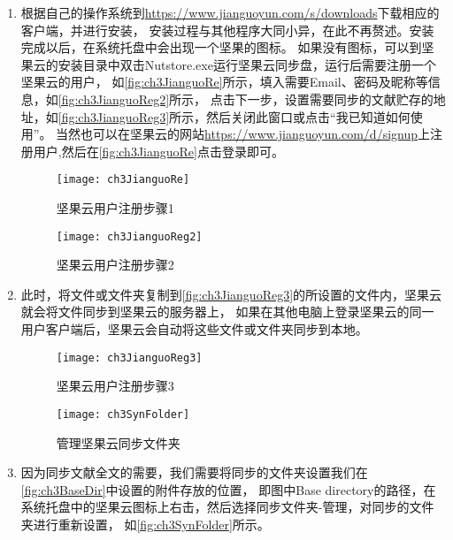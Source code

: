 \documentclass[cn,11pt,chinese]{elegantbook}
\begin{document}
		\begin{enumerate}
			\item 根据自己的操作系统到\url{https://www.jianguoyun.com/s/downloads}下载相应的客户端，并进行安装，
			安装过程与其他程序大同小异，在此不再赘述。安装完成以后，在系统托盘中会出现一个坚果的图标。
			如果没有图标，可以到坚果云的安装目录中双击Nutstore.exe运行坚果云同步盘，运行后需要注册一个坚果云的用户，
			如\autoref{fig:ch3JianguoRe}所示，填入需要Email、密码及昵称等信息，如\autoref{fig:ch3JianguoReg2}所示，
			点击下一步，设置需要同步的文献贮存的地址，如\autoref{fig:ch3JianguoReg3}所示，然后关闭此窗口或点击“我已知道如何使用”。
			当然也可以在坚果云的网站\url{https://www.jianguoyun.com/d/signup}上注册用户,然后在\autoref{fig:ch3JianguoRe}点击登录即可。
			
			\begin{figure}[htbp]
				\centering
				\begin{minipage}[t]{\dimexpr0.5\textwidth-4em}
					\centering
					\texttt{[image: ch3JianguoRe]}
					\caption{坚果云用户注册步骤1}
					\label{fig:ch3JianguoRe}
				\end{minipage}
				\centering
				\begin{minipage}[t]{\dimexpr0.5\textwidth-4em}
					\centering
					\texttt{[image: ch3JianguoReg2]}
					\caption{坚果云用户注册步骤2}
					\label{fig:ch3JianguoReg2}
				\end{minipage}	
			\end{figure}
			

			
			\item 此时，将文件或文件夹复制到\autoref{fig:ch3JianguoReg3}的所设置的文件内，坚果云就会将文件同步到坚果云的服务器上，
			如果在其他电脑上登录坚果云的同一用户客户端后，坚果云会自动将这些文件或文件夹同步到本地。
				\begin{figure}
					\centering
					\begin{minipage}[t]{\dimexpr0.5\textwidth-4em}
					\centering
					\texttt{[image: ch3JianguoReg3]}
					\caption{坚果云用户注册步骤3}
					\label{fig:ch3JianguoReg3}
				\end{minipage}
					\begin{minipage}[t]{\dimexpr0.5\textwidth-4em}
						\centering
						\texttt{[image: ch3SynFolder]}
						\caption{管理坚果云同步文件夹}
						\label{fig:ch3SynFolder}
					\end{minipage}
				\end{figure}
			\item  因为同步文献全文的需要，我们需要将同步的文件夹设置我们在\autoref{fig:ch3BaseDir}中设置的附件存放的位置，
			即图中Base directory的路径，在系统托盘中的坚果云图标上右击，然后选择同步文件夹-管理，对同步的文件夹进行重新设置，
			如\autoref{fig:ch3SynFolder}所示。
			

\end{enumerate}
\end{document}
